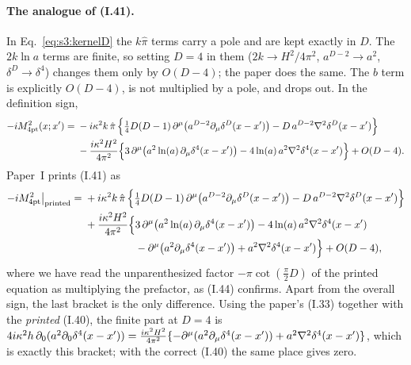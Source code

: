\documentclass[aps,prd,onecolumn,10pt,nofootinbib,floatfix]{revtex4-2}
\newcommand{\PI}{Paper~I}
\newcommand{\eqI}[1]{(I.#1)}
\newcommand{\pihat}{\hat\pi}
\begin{document}
\paragraph*{The analogue of \eqI{41}.}
In Eq.~\eqref{eq:s3:kernelD} the $k\pihat$ terms carry a pole and are kept exactly in $D$. The
$2k\ln a$ terms are finite, so setting $D=4$ in them ($2k\to H^2/4\pi^2$, $a^{D-2}\to a^2$,
$\delta^D\to\delta^4$) changes them only by $O(D-4)$; the paper does the same. The $b$ term is
explicitly $O(D-4)$, is not multiplied by a pole, and drops out. In the definition sign,
\begin{equation}\label{eq:s3:I41}
\begin{aligned}
-i\sthreeM(x;x')={}&-i\kappa^2k\,\pihat\,\Bigl\{\tfrac14D(D-1)\,\partial^\mu\bigl(a^{D-2}\partial_\mu\sthreedel\bigr)
-D\,a^{D-2}\nabla^2\sthreedel\Bigr\}\\
&-\frac{i\kappa^2H^2}{4\pi^2}\Bigl\{3\,\partial^\mu\bigl(a^2\ln(a)\,\partial_\mu\sthreedelf\bigr)
-4\ln(a)\,a^2\nabla^2\sthreedelf\Bigr\}+O(D-4).
\end{aligned}
\end{equation}
\PI{} prints \eqI{41} as
\begin{equation}\label{eq:s3:I41printed}
\begin{aligned}
-i\sthreeM\big|_{\rm printed}={}&+i\kappa^2k\,\pihat\,\Bigl\{\tfrac14D(D-1)\,\partial^\mu\bigl(a^{D-2}\partial_\mu\sthreedel\bigr)
-D\,a^{D-2}\nabla^2\sthreedel\Bigr\}\\
&+\frac{i\kappa^2H^2}{4\pi^2}\Bigl\{3\,\partial^\mu\bigl(a^2\ln(a)\,\partial_\mu\sthreedelf\bigr)
-4\ln(a)\,a^2\nabla^2\sthreedelf\\
&\hphantom{{}+\frac{i\kappa^2H^2}{4\pi^2}\Bigl\{}
-\partial^\mu\bigl(a^2\partial_\mu\sthreedelf\bigr)+a^2\nabla^2\sthreedelf\Bigr\}+O(D-4),
\end{aligned}
\end{equation}
where we have read the unparenthesized factor $-\pi\cot(\frac\pi2D)$ of the printed equation as
multiplying the prefactor, as \eqI{44} confirms. Apart from the overall sign, the last bracket
is the only difference. Using the paper's \eqI{33} together with the \emph{printed} \eqI{40}, the
finite part at $D=4$ is $4i\kappa^2h\,\partial_0(a^2\partial_0\delta^4(x-x'))
=\frac{i\kappa^2H^2}{4\pi^2}\{-\partial^\mu(a^2\partial_\mu\delta^4(x-x'))+a^2\nabla^2\delta^4(x-x')\}$, which
is exactly this bracket; with the correct \eqI{40} the same place gives zero.
\end{document}
